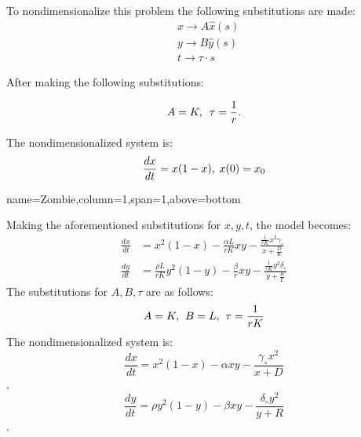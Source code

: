 \documentclass[landscape,final,a0paper,fontscale=0.285]{baposter}
\begin{document}
\begin{poster}
{  
To nondimensionalize this problem the following substitutions are made:
\begin{align*}
		& x \rightarrow A \hat{x} (s) \\
		& y \rightarrow B \hat{y} (s) \\
		& t \rightarrow \tau \cdot s
\end{align*}

After making the following substitutions:

		$$A = K, \hspace{.5em}
		\tau = \frac{1}{r}.$$

The nondimensionalized system is: $$\frac{d{x}}{dt}= x(1-x), \hspace{.25em} x(0)=x_0$$


}



   {name=Zombie,column=1,span=1,above=bottom}{
    
    Making the aforementioned substitutions for $x,y,t$, the model becomes:
        \begin{align*}
            \frac{dx}{dt} & = x^2 (1-x) - \frac{\alpha L}{rK} xy - \frac{\frac{1}{rK}x^2 \gamma_\circ}{x + \frac{D}{K}} \\
            \frac{dy}{dt} & = \frac{\rho L}{rK} y^2 (1-y) - \frac{\beta}{r} xy - \frac{\frac{1}{rK}y^2 \delta_\circ}{y + \frac{R}{L}}
        \end{align*} 
        The substitutions for $A, B, \tau$ are as follows:
        $$A=K, \hspace{.4em} B=L,\hspace{.4em} \tau=\frac{1}{rK}$$ 
        The nondimensionalized system is:
    $$\frac{dx}{dt} = x^2 (1-x) - \alpha xy - \frac{\gamma_\circ x^2}{x+D}$$, 
    $$\frac{dy}{dt} = \rho y^2 (1-y) - \beta xy -\frac{\delta_\circ y^2}{y+R}$$.
 }


\end{poster}
\end{document}
